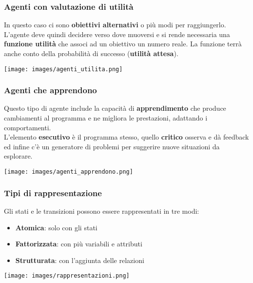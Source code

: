 \subsubsection{Agenti con valutazione di utilità}
In questo caso ci sono \textbf{obiettivi alternativi} o più modi per raggiungerlo. L'agente deve quindi decidere verso dove muoversi e si rende necessaria una \textbf{funzione utilità} che associ ad un obiettivo un numero reale. La funzione terrà anche conto della probabilità di successo (\textbf{utilità attesa}).
\begin{center}
	\texttt{[image: images/agenti\_utilita.png]}
\end{center}

\subsubsection{Agenti che apprendono}
Questo tipo di agente include la capacità di \textbf{apprendimento} che produce cambiamenti al programma e ne migliora le prestazioni, adattando i comportamenti.\\
L'elemento \textbf{esecutivo} è il programma stesso, quello \textbf{critico} osserva e dà feedback ed infine c'è un generatore di problemi per suggerire nuove situazioni da esplorare.
\begin{center}
	\texttt{[image: images/agenti\_apprendono.png]}
\end{center}

\subsubsection{Tipi di rappresentazione}
Gli stati e le transizioni possono essere rappresentati in tre modi:
\begin{itemize}
	\item \textbf{Atomica}: solo con gli stati
	\item \textbf{Fattorizzata}: con più variabili e attributi
	\item \textbf{Strutturata}: con l'aggiunta delle relazioni
\end{itemize}
\begin{center}
	\texttt{[image: images/rappresentazioni.png]}
\end{center}